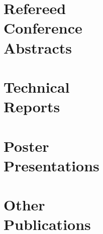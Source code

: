 \documentclass[margin,line]{resume}
\begin{document}
\begin{resume}
    \section{\mysidestyle Refereed\\Conference\\Abstracts}
    \begin{bibenum}
         \item {}
         \item {}
    \end{bibenum}

    \section{\mysidestyle Technical\\Reports}
    \begin{bibenum}
       \item {}
    \end{bibenum}
    \section{\mysidestyle Poster\\Presentations}
    \begin{bibenum}
        \item {}
        \item {}
    \end{bibenum}
    \section{\mysidestyle Other\\Publications}
    \begin{bibenum}
         \item {}
    \end{bibenum}

\end{resume}
\end{document}
